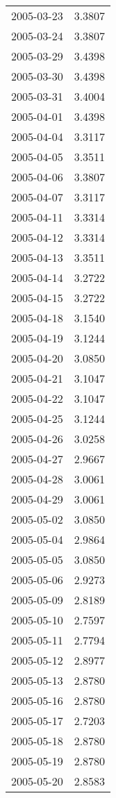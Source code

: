 \begin{tabular}{lr}
2005-03-23 &      3.3807 \\
2005-03-24 &      3.3807 \\
2005-03-29 &      3.4398 \\
2005-03-30 &      3.4398 \\
2005-03-31 &      3.4004 \\
2005-04-01 &      3.4398 \\
2005-04-04 &      3.3117 \\
2005-04-05 &      3.3511 \\
2005-04-06 &      3.3807 \\
2005-04-07 &      3.3117 \\
2005-04-11 &      3.3314 \\
2005-04-12 &      3.3314 \\
2005-04-13 &      3.3511 \\
2005-04-14 &      3.2722 \\
2005-04-15 &      3.2722 \\
2005-04-18 &      3.1540 \\
2005-04-19 &      3.1244 \\
2005-04-20 &      3.0850 \\
2005-04-21 &      3.1047 \\
2005-04-22 &      3.1047 \\
2005-04-25 &      3.1244 \\
2005-04-26 &      3.0258 \\
2005-04-27 &      2.9667 \\
2005-04-28 &      3.0061 \\
2005-04-29 &      3.0061 \\
2005-05-02 &      3.0850 \\
2005-05-04 &      2.9864 \\
2005-05-05 &      3.0850 \\
2005-05-06 &      2.9273 \\
2005-05-09 &      2.8189 \\
2005-05-10 &      2.7597 \\
2005-05-11 &      2.7794 \\
2005-05-12 &      2.8977 \\
2005-05-13 &      2.8780 \\
2005-05-16 &      2.8780 \\
2005-05-17 &      2.7203 \\
2005-05-18 &      2.8780 \\
2005-05-19 &      2.8780 \\
2005-05-20 &      2.8583 \\

\end{tabular}

